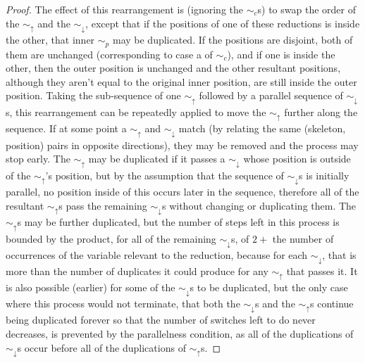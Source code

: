 \begin{proof}
  The effect of this rearrangement is (ignoring the $\sim_c$s) to swap the order of the $\sim_\uparrow$ and the $\sim_\downarrow$, except that if the positions of one of these reductions is inside the other, that inner $\sim_p$ may be duplicated. If the positions are disjoint, both of them are unchanged (corresponding to case a of $\sim_c$), and if one is inside the other, then the outer position is unchanged and the other resultant positions, although they aren't equal to the original inner position, are still inside the outer position. Taking the sub-sequence of one $\sim_\uparrow$ followed by a parallel sequence of $\sim_\downarrow$s, this rearrangement can be repeatedly applied to move the $\sim_\uparrow$ further along the sequence. If at some point a $\sim_\uparrow$ and $\sim_\downarrow$ match (by relating the same (skeleton, position) pairs in opposite directions), they may be removed and the process may stop early. The $\sim_\uparrow$ may be duplicated if it passes a $\sim_\downarrow$ whose position is outside of the $\sim_\uparrow$'s position, but by the assumption that the sequence of $\sim_\downarrow$s is initially parallel, no position inside of this occurs later in the sequence, therefore all of the resultant $\sim_\uparrow$s pass the remaining $\sim_\downarrow$s without changing or duplicating them. The $\sim_\uparrow$s may be further duplicated, but the number of steps left in this process is bounded by the product, for all of the remaining $\sim_\downarrow$s, of $2 +$ the number of occurrences of the variable relevant to the reduction, because for each $\sim_\downarrow$, that is more than the number of duplicates it could produce for any $\sim_\uparrow$ that passes it. It is also possible (earlier) for some of the $\sim_\downarrow$s to be duplicated, but the only case where this process would not terminate, that both the $\sim_\downarrow$s and the $\sim_\uparrow$s continue being duplicated forever so that the number of switches left to do never decreases, is prevented by the parallelness condition, as all of the duplications of $\sim_\downarrow$s occur before all of the duplications of $\sim_\uparrow$s.


\end{proof}
